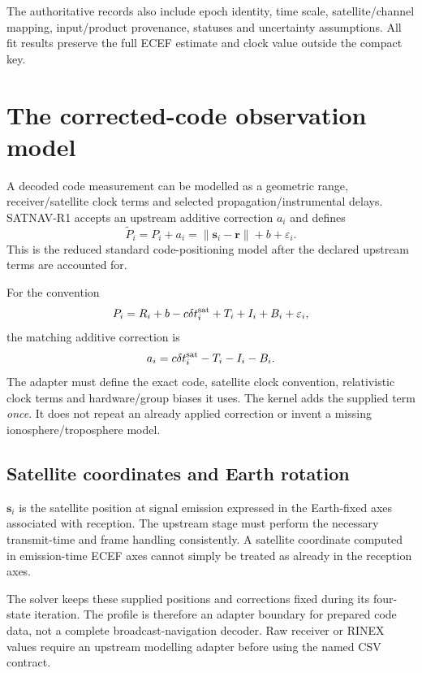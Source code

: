 The authoritative records also include epoch identity, time scale, satellite/channel
mapping, input/product provenance, statuses and uncertainty assumptions. All fit
results preserve the full ECEF estimate and clock value outside the compact key.
\clearpage

\section{The corrected-code observation model}
A decoded code measurement can be modelled as a geometric range, receiver/satellite
clock terms and selected propagation/instrumental delays. SATNAV-R1 accepts an
upstream additive correction $a_i$ and defines
\begin{equation}
\widetilde P_i=P_i+a_i=\|\boldsymbol s_i-\boldsymbol r\|+b+\varepsilon_i.
\end{equation}
This is the reduced standard code-positioning model after the declared upstream
terms are accounted for. 

For the convention
\begin{equation}
P_i=R_i+b-c\delta t_i^{\rm sat}+T_i+I_i+B_i+\varepsilon_i,
\end{equation}
the matching additive correction is
\begin{equation}
a_i=c\delta t_i^{\rm sat}-T_i-I_i-B_i.
\end{equation}
The adapter must define the exact code, satellite clock convention, relativistic
clock terms and hardware/group biases it uses. The kernel adds the supplied term
\emph{once}. It does not repeat an already applied correction or invent a missing
ionosphere/troposphere model.

\subsection{Satellite coordinates and Earth rotation}
$\boldsymbol s_i$ is the satellite position at signal emission expressed in the
Earth-fixed axes associated with reception. The upstream stage must perform the
necessary transmit-time and frame handling consistently. A satellite coordinate
computed in emission-time ECEF axes cannot simply be treated as already in the
reception axes. 

The solver keeps these supplied positions and corrections fixed during its four-state
iteration. The profile is therefore an adapter boundary for prepared code data,
not a complete broadcast-navigation decoder. Raw receiver or RINEX values require
an upstream modelling adapter before using the named CSV contract. 


